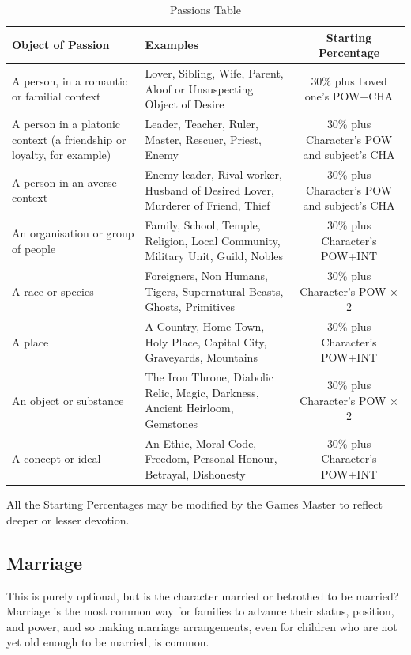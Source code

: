 \documentclass[10pt]{article}
\begin{document}
\begin{longtable}{|p{3cm}|p{5cm}|c|}
\caption{Passions Table}
\label{tab:passions}\\
\hline
\textbf{Object of Passion} & \textbf{Examples} & \textbf{Starting Percentage} \\
\hline
A person, in a romantic or familial context & Lover, Sibling, Wife, Parent, Aloof or Unsuspecting Object of Desire & 30\% plus Loved one's POW+CHA \\
\hline
A person in a platonic context (a friendship or loyalty, for example) & Leader, Teacher, Ruler, Master, Rescuer, Priest, Enemy & 30\% plus Character's POW and subject's CHA \\
\hline
A person in an averse context & Enemy leader, Rival worker, Husband of Desired Lover, Murderer of Friend, Thief & 30\% plus Character's POW and subject's CHA \\
\hline
An organisation or group of people & Family, School, Temple, Religion, Local Community, Military Unit, Guild, Nobles & 30\% plus Character's POW+INT \\
\hline
A race or species & Foreigners, Non Humans, Tigers, Supernatural Beasts, Ghosts, Primitives & 30\% plus Character's POW × 2 \\
\hline
A place & A Country, Home Town, Holy Place, Capital City, Graveyards, Mountains & 30\% plus Character's POW+INT \\
\hline
An object or substance & The Iron Throne, Diabolic Relic, Magic, Darkness, Ancient Heirloom, Gemstones & 30\% plus Character's POW × 2 \\
\hline
A concept or ideal & An Ethic, Moral Code, Freedom, Personal Honour, Betrayal, Dishonesty & 30\% plus Character's POW+INT \\
\hline
\end{longtable}

All the Starting Percentages may be modified by the Games Master to reflect deeper or lesser devotion.

\subsection{Marriage}
\label{sec:marriage}

This is purely optional, but is the character married or betrothed to be married? Marriage is the most common way for families to advance their status, position, and power, and so making marriage arrangements, even for children who are not yet old enough to be married, is common.
\end{document}
